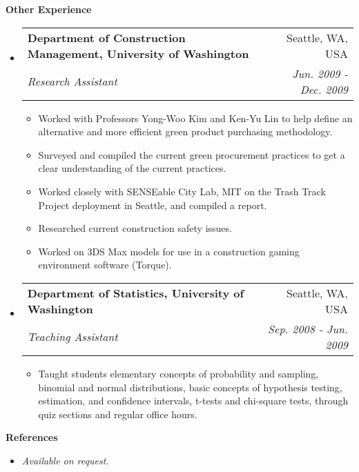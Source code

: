 \documentclass[letterpaper,10pt]{article}
\makeatletter
\newcommand{\resitem}[1]{\item #1}
\newcommand{\resheading}[1]{{\large \colorbox{mygrey}{\vspace{0.6in} \begin{minipage}{\textwidth}{\textbf{#1 \vphantom{p\^{E}}}}\end{minipage}}}}
\newcommand{\ressubheading}[4]{
  \begin{tabular*}{7in}{l@{\extracolsep{\fill}}r}
    \textbf{#1} & #2 \\
    \textit{#3} & \textit{#4} \\
\end{tabular*}}
\makeatother
\begin{document}
\resheading{Other Experience}
\begin{itemize}

\item
  \ressubheading{Department of Construction Management, University of Washington}{Seattle, WA, USA}{Research Assistant}{Jun. 2009 - Dec. 2009}
  \begin{itemize}
    \resitem{Worked with Professors Yong-Woo Kim and Ken-Yu Lin to help define an alternative and more efficient green product purchasing methodology.}
    \resitem{Surveyed and compiled the current green procurement practices to get a clear understanding of the current practices.}
    \resitem{Worked closely with SENSEable City Lab, MIT on the Trash Track Project deployment in Seattle, and compiled a report.}
    \resitem{Researched current construction safety issues.}
    \resitem{Worked on 3DS Max models for use in a construction gaming environment software (Torque).}
  \end{itemize}

\item
  \ressubheading{Department of Statistics, University of Washington}{Seattle, WA, USA}{Teaching Assistant}{Sep. 2008 - Jun. 2009}
  \begin{itemize}
    \resitem{Taught students elementary concepts of probability and sampling, binomial and normal distributions, basic concepts of hypothesis testing, estimation, and confidence intervals, t-tests and chi-square tests, through quiz sections and regular office hours.}
  \end{itemize}

\end{itemize}

\resheading{References}
\begin{itemize}
\item \textit{Available on request.}
\end{itemize}

\end{document}
